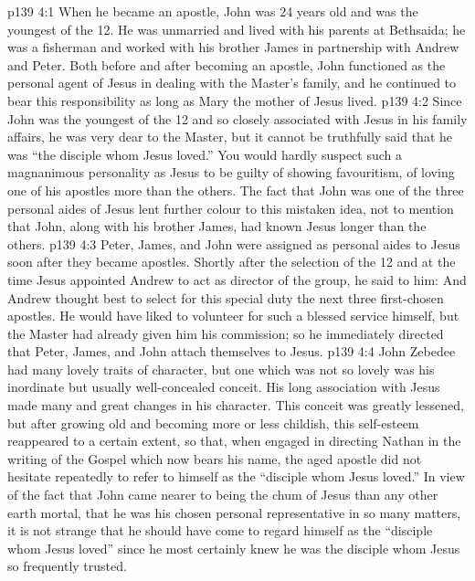 \vs p139 4:1 When he became an apostle, John was 24 years old and was the youngest of the 12. He was unmarried and lived with his parents at Bethsaida; he was a fisherman and worked with his brother James in partnership with Andrew and Peter. Both before and after becoming an apostle, John functioned as the personal agent of Jesus in dealing with the Master’s family, and he continued to bear this responsibility as long as Mary the mother of Jesus lived.
\vs p139 4:2 Since John was the youngest of the 12 and so closely associated with Jesus in his family affairs, he was very dear to the Master, but it cannot be truthfully said that he was “the disciple whom Jesus loved.” You would hardly suspect such a magnanimous personality as Jesus to be guilty of showing favouritism, of loving one of his apostles more than the others. The fact that John was one of the three personal aides of Jesus lent further colour to this mistaken idea, not to mention that John, along with his brother James, had known Jesus longer than the others.
\vs p139 4:3 \pc Peter, James, and John were assigned as personal aides to Jesus soon after they became apostles. Shortly after the selection of the 12 and at the time Jesus appointed Andrew to act as director of the group, he said to him:  And Andrew thought best to select for this special duty the next three first\hyp{}chosen apostles. He would have liked to volunteer for such a blessed service himself, but the Master had already given him his commission; so he immediately directed that Peter, James, and John attach themselves to Jesus.
\vs p139 4:4 \pc John Zebedee had many lovely traits of character, but one which was not so lovely was his inordinate but usually well\hyp{}concealed conceit. His long association with Jesus made many and great changes in his character. This conceit was greatly lessened, but after growing old and becoming more or less childish, this self\hyp{}esteem reappeared to a certain extent, so that, when engaged in directing Nathan in the writing of the Gospel which now bears his name, the aged apostle did not hesitate repeatedly to refer to himself as the “disciple whom Jesus loved.” In view of the fact that John came nearer to being the chum of Jesus than any other earth mortal, that he was his chosen personal representative in so many matters, it is not strange that he should have come to regard himself as the “disciple whom Jesus loved” since he most certainly knew he was the disciple whom Jesus so frequently trusted.
